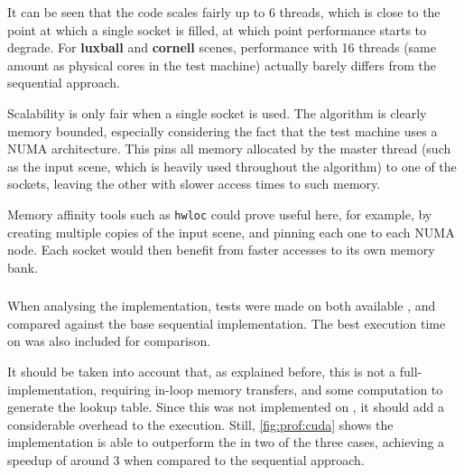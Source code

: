 \documentclass[main.tex]{subfiles}
\begin{document}
It can be seen that the code scales fairly up to 6 threads, which is close to the point at which a single \cpu socket is filled, at which point performance starts to degrade.
For \textbf{luxball} and \textbf{cornell} scenes, performance with 16 threads (same amount as physical \cpu cores in the test machine) actually barely differs from the sequential approach.

Scalability is only fair when a single socket is used. The algorithm is clearly memory bounded, especially considering the fact that the test machine uses a \acs{NUMA} architecture. This pins all memory allocated by the master thread (such as the input scene, which is heavily used throughout the algorithm) to one of the sockets, leaving the other with slower access times to such memory.

Memory affinity tools such as \texttt{hwloc} could prove useful here, for example, by creating multiple copies of the input scene, and pinning each one to each \acs{NUMA} node. Each socket would then benefit from faster accesses to its own memory bank.

\subsubsection{\gpu}

When analysing the \gpu implementation, tests were made on both available \gpus, and compared against the base sequential \cpu implementation. The best execution time on \cpu was also included for comparison.

It should be taken into account that, as explained before, this is not a full-\gpu implementation, requiring in-loop memory transfers, and some \cpu computation to generate the lookup table. Since this was not implemented on \gpu, it should add a considerable overhead to the execution. Still, \cref{fig:prof:cuda} shows the implementation is able to outperform the \cpu in two of the three cases, achieving a speedup of around 3 when compared to the sequential approach.

\end{document}
